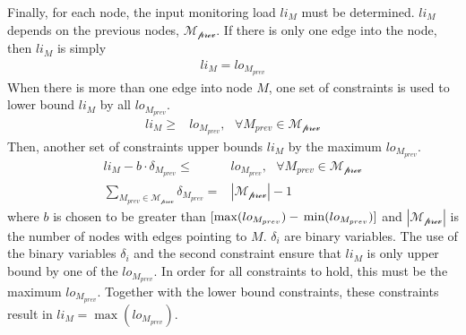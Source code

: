 Finally, for each node, the input monitoring load $li_{M}$ must be determined.
$li_{M}$ depends on the previous nodes, $\mathcal{M_\text{prev}}$. If there is
only one edge into the node, then $li_M$ is simply
\begin{align*}
  li_{M} = lo_{M_{prev}}
\end{align*}
When there is more than one edge into node $M$, one set of constraints is used
to lower bound $li_{M}$ by all $lo_{M_{prev}}$.
\begin{align*}
  li_{M} \geq& lo_{M_{prev}}, \text{ } \forall M_{prev} \in \mathcal{M_\text{prev}}
\end{align*}
Then, another set of constraints upper bounds $li_{M}$ by the maximum $lo_{M_{prev}}$.
\begin{align*}
  li_{M} - b \cdot \delta_{M_{prev}} \leq& lo_{M_{prev}}, \text{ } \forall M_{prev} \in \mathcal{M_\text{prev}} \\
  \sum_{M_{prev} \in \mathcal{M_\text{prev}}}\delta_{M_{prev}} =& |\mathcal{M_\text{prev}}| - 1
\end{align*}
where $b$ is chosen to be greater than $[\max(lo_{M_{prev}}) -\\
\min(lo_{M_{prev}})]$ and $|\mathcal{M_\text{prev}}|$ is the number of nodes
with edges pointing to $M$. $\delta_i$ are binary variables. The use of the
binary variables $\delta_i$ and the second constraint ensure that $li_{M}$ is
only upper bound by one of the $lo_{M_{prev}}$. In order for all constraints to
hold, this must be the maximum $lo_{M_{prev}}$. Together with the lower bound
constraints, these constraints result in $li_{M} = \max(lo_{M_{prev}})$. 

